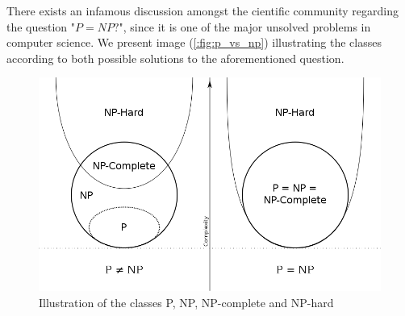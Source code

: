 There exists an infamous discussion amongst the cientific community regarding the question "$P=NP?$",
since it is one of the major unsolved problems in computer science.
We present image (\ref{:fig:p_vs_np}) illustrating the classes according to both possible solutions to the aforementioned question. 
\begin{figure}[]
  \centering
  \includegraphics[width=\textwidth]{Figures/2.Chapter/p_vs_np.png}
	\caption{Illustration of the classes P, NP, NP-complete and NP-hard}
  \label{fig:p_vs_np}  
\end{figure}



